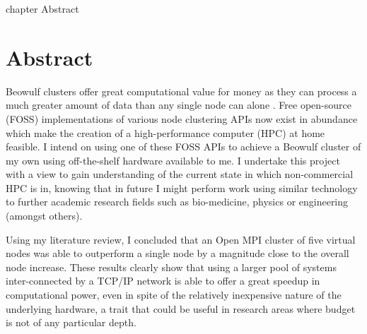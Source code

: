 \cleardoublepage
{}
{}
    {chapter}
    {Abstract}

\chapter*{Abstract}
Beowulf clusters offer great computational value for money as they can process a much greater amount of data than any single node can alone \cite{sterling_1995}. Free open-source (FOSS) implementations of various node clustering APIs now exist in abundance which make the creation of a high-performance computer (HPC) at home feasible. I intend on using one of these FOSS APIs to achieve a Beowulf cluster of my own using off-the-shelf hardware available to me. I undertake this project with a view to gain understanding of the current state in which non-commercial HPC is in, knowing that in future I might perform work using similar technology to further academic research fields such as bio-medicine, physics or engineering (amongst others).

Using my literature review, I concluded that an Open MPI cluster of five virtual nodes was able to outperform a single node by a magnitude close to the overall node increase. These results clearly show that using a larger pool of systems inter-connected by a TCP/IP network is able to offer a great speedup in computational power, even in spite of the relatively inexpensive nature of the underlying hardware, a trait that could be useful in research areas where budget is not of any particular depth.
